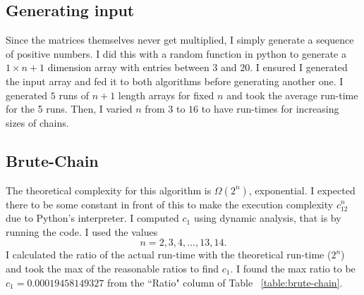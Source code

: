 \documentclass[letterpaper,titlepage]{article}
\begin{document}
\subsection{Generating input}
Since the matrices themselves never get multiplied, I simply generate a sequence of positive numbers. I did this with a random function in python to generate a $1 \times n+1$ dimension array with entries between $3$ and $20$. I ensured I generated the input array and fed it to both algorithms before generating another one. I generated $5$ runs of $n+1$ length arrays for fixed $n$ and took the average run-time for the 5 runs. Then, I varied $n$ from $3$ to $16$ to have run-times for increasing sizes of chains.


\subsection{Brute-Chain}
The theoretical complexity for this algorithm is $\Omega(2^n)$, exponential. I expected there to be some constant in front of this to make the execution complexity $c_12^n$ due to Python's interpreter. I computed $c_1$ using dynamic analysis, that is by running the code. I used the values
$$n = 2,3,4,\dots,13,14.$$
I calculated the ratio of the actual run-time with the theoretical run-time ($2^n$) and took the max of the reasonable ratios to find $c_1$. I found the max ratio to be $c_1=0.00019458149327$ from the ``Ratio" column of Table ~\ref{table:brute-chain}.
\end{document}

